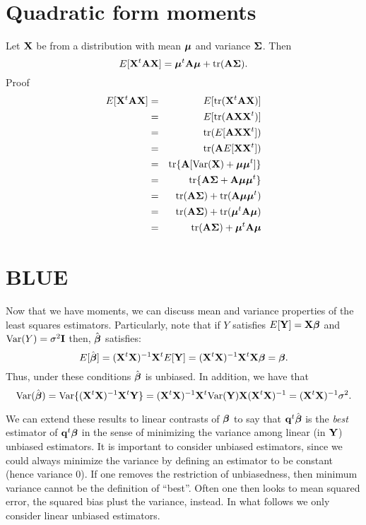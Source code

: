 \section{Quadratic form moments}
\label{sec:qfm}
Let $\mathbf{X}$ be from a distribution with mean $\boldsymbol{\mu}$ and variance
$\boldsymbol{\Sigma}$. Then 
$$
E[\mathbf{X}^t \mathbf{A} \mathbf{X}] = \boldsymbol{\mu}^t \mathbf{A} \boldsymbol{\mu} + \mbox{tr}(\mathbf{A} \boldsymbol{\Sigma}).
$$
Proof
\begin{eqnarray*}
E[\mathbf{X}^t \mathbf{A} \mathbf{X}] & = & E[\mbox{tr}(\mathbf{X}^t \mathbf{A} \mathbf{X})]\\
& = & E[\mbox{tr}(\mathbf{A} \mathbf{X} \mathbf{X}^t )]\\
& = &  \mbox{tr}(E[\mathbf{A}  \mathbf{X} \mathbf{X}^t])\\
& = & \mbox{tr}(\mathbf{A} E[\mathbf{X} \mathbf{X}^t])\\
& = & \mbox{tr}\{\mathbf{A} [\mbox{Var}(\mathbf{X}) + \boldsymbol{\mu} \boldsymbol{\mu}^t]\}\\
& = & \mbox{tr}\{\mathbf{A}\boldsymbol{\Sigma} + \mathbf{A} \boldsymbol{\mu} \boldsymbol{\mu}^t\}\\
& = & \mbox{tr}(\mathbf{A}\boldsymbol{\Sigma}) + \mbox{tr}(\mathbf{A} \boldsymbol{\mu} \boldsymbol{\mu}^t)\\
& = & \mbox{tr}(\mathbf{A}\boldsymbol{\Sigma}) + \mbox{tr}(\boldsymbol{\mu}^t \mathbf{A} \boldsymbol{\mu} )\\
& = & \mbox{tr}(\mathbf{A}\boldsymbol{\Sigma}) + \boldsymbol{\mu}^t \mathbf{A} \boldsymbol{\mu} \\
\end{eqnarray*}

\section{BLUE} 

Now that we have moments, we can discuss mean and variance properties of the 
least squares estimators. Particularly, note that if $Y$ satisfies
$E[\mathbf{Y}] = \mathbf{X} \boldsymbol{\beta}$ and $\mbox{Var}(Y) = \sigma^2 \mathbf{I}$ then, $\hat {\boldsymbol{\beta}}$ 
satisfies: 
$$E[\hat {\boldsymbol{\beta}}] = (\mathbf{X}^t \mathbf{X})^{-1} \mathbf{X}^t E[\mathbf{Y}] = (\mathbf{X}^t \mathbf{X})^{-1} \mathbf{X}^t \mathbf{X} \boldsymbol{\beta} = \boldsymbol{\beta}.$$
Thus, under these conditions $\hat {\boldsymbol{\beta}}$ is unbiased. In addition, we have
that 
$$
\mbox{Var}(\hat {\boldsymbol{\beta}}) = \mbox{Var}\{(\mathbf{X}^t \mathbf{X})^{-1} \mathbf{X}^t \mathbf{Y}\} = (\mathbf{X}^t \mathbf{X})^{-1} \mathbf{X}^t \mbox{Var}(\mathbf{Y}) \mathbf{X} (\mathbf{X}^t \mathbf{X})^{-1}
= (\mathbf{X}^t \mathbf{X})^{-1} \sigma^2. 
$$

We can extend these results to linear contrasts of $\boldsymbol{\beta}$ 
to say that $\mathbf{q}^t \hat {\boldsymbol{\beta}}$ is the {\it best}
estimator of $\mathbf{q}^t \boldsymbol{\beta}$ in the sense of minimizing the variance among
linear (in $\mathbf{Y}$) unbiased estimators. It is important to consider
unbiased estimators, since we could always minimize the variance
by defining an estimator to be constant (hence variance 0). If one
removes the restriction of unbiasedness, then minimum variance cannot
be the definition of ``best''. Often one then looks to mean squared
error, the squared bias plust the variance, instead. In what follows
we only consider linear unbiased estimators.

